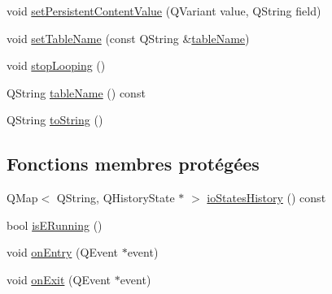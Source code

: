 \begin{DoxyCompactItemize}
\item 
void \hyperlink{classSh__LoopingInOutStateMachine_a087727c67edb0961797c35d613003bfa}{set\-Persistent\-Content\-Value} (Q\-Variant value, Q\-String field)
\item 
void \hyperlink{classSH__InOutStateMachine_a95db31a7e7f31f36a8737adc739ab08c}{set\-Table\-Name} (const Q\-String \&\hyperlink{classSH__InOutStateMachine_a4288a6c86ddf83effefff886675591c9}{table\-Name})
\item 
void \hyperlink{classSh__LoopingInOutStateMachine_a2ddae49a46de3794fd934f830d2388f8}{stop\-Looping} ()
\item 
Q\-String \hyperlink{classSH__InOutStateMachine_a4288a6c86ddf83effefff886675591c9}{table\-Name} () const 
\item 
Q\-String \hyperlink{classSH__InOutStateMachine_abfd2be3aa5860e0e92a1a6d30f8e36ce}{to\-String} ()
\end{DoxyCompactItemize}
\subsection*{Fonctions membres protégées}
\begin{DoxyCompactItemize}
\item 
Q\-Map$<$ Q\-String, Q\-History\-State $\ast$ $>$ \hyperlink{classSH__InOutStateMachine_a13889998c6dcd17db984dd6ed1454e80}{io\-States\-History} () const 
\item 
bool \hyperlink{classSH__InOutStateMachine_a49cc791a678db21a716a15d7b7551048}{is\-E\-Running} ()
\item 
void \hyperlink{classSH__InOutStateMachine_af0992a9f5790295f111cdc1f3f44dab8}{on\-Entry} (Q\-Event $\ast$event)
\item 
void \hyperlink{classSH__InOutStateMachine_a642cd55f8af6decb317018bed9f7c1b7}{on\-Exit} (Q\-Event $\ast$event)
\end{DoxyCompactItemize}
